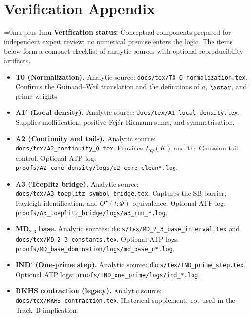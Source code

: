 \section{Verification Appendix}\label{sec:verification}
\begingroup
\sloppy
\Urlmuskip=0mu plus 1mu
\renewcommand{\UrlFont}{\ttfamily\small}
\textbf{Verification status:} Conceptual components prepared for independent expert review; no numerical premise enters the logic. The items below form a compact checklist of analytic sources with optional reproducibility artifacts.
\begin{itemize}[leftmargin=2.2em]
  \item \textbf{T0 (Normalization).} Analytic source: \texttt{docs/tex/T0\_Q\_normalization.tex}. Confirms the Guinand--Weil translation and the definitions of $a$, $\astar$, and prime weights.

  \item \textbf{A1$'$ (Local density).} Analytic source: \texttt{docs/tex/A1\_local\_density.tex}. Supplies mollification, positive Fej\'er Riemann sums, and symmetrisation.

  \item \textbf{A2 (Continuity and tails).} Analytic source: \texttt{docs/tex/A2\_continuity\_Q.tex}. Provides $L_Q(K)$ and the Gaussian tail control. Optional ATP log: \texttt{proofs/A2\_cone\_density/logs/a2\_core\_clean*.log}.

  \item \textbf{A3 (Toeplitz bridge).}\label{subsec:a3-atp} Analytic source: \texttt{docs/tex/A3\_toeplitz\_symbol\_bridge.tex}. Captures the SB barrier, Rayleigh identification, and $Q^\star(t;\Phi)$ equivalence. Optional ATP log: \texttt{proofs/A3\_toeplitz\_bridge/logs/a3\_run\_*.log}.

  \item \textbf{MD$_{2,3}$ base.}\label{subsec:md-atp} Analytic sources: \texttt{docs/tex/MD\_2\_3\_base\_interval.tex} and \texttt{docs/tex/MD\_2\_3\_constants.tex}. Optional ATP logs: \texttt{proofs/MD\_base\_domination/logs/md\_base\_n*.log}.

  \item \textbf{IND$'$ (One-prime step).}\label{subsec:ind-atp} Analytic source: \texttt{docs/tex/IND\_prime\_step.tex}. Optional ATP logs: \texttt{proofs/IND\_one\_prime/logs/ind\_*.log}.

  \item \textbf{RKHS contraction (legacy).} Analytic source: \texttt{docs/tex/RKHS\_contraction.tex}. Historical supplement, not used in the Track~B implication.


\end{itemize}
